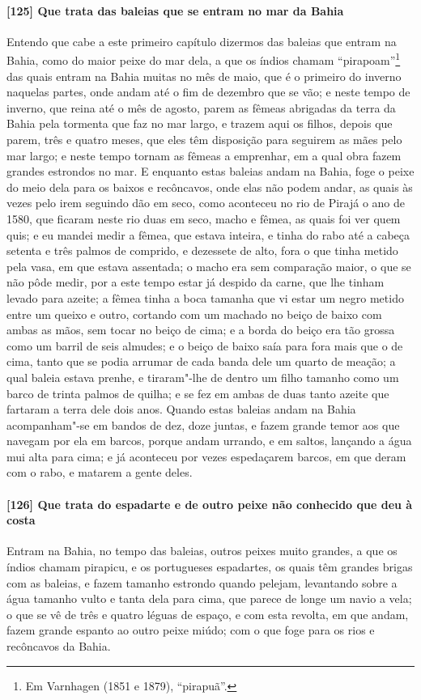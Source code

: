 \begin{linenumbers}
\paragraph{[125] Que trata das baleias que se entram no mar da Bahia}\quad
Entendo que cabe a este primeiro capítulo dizermos das baleias que entram na Bahia, como
do maior peixe do mar dela, a que os índios chamam ``pirapoam''\footnote{ Em Varnhagen
(1851 e 1879), ``pirapuã''.} das quais entram na Bahia muitas no mês de maio, que é o
primeiro do inverno naquelas partes, onde andam até o fim de dezembro que se vão; e neste
tempo de inverno, que reina até o mês de agosto, parem as fêmeas abrigadas da terra da
Bahia pela tormenta que faz no mar largo, e trazem aqui os filhos, depois que parem, três
e quatro meses, que eles têm disposição para seguirem as mães pelo mar largo; e neste
tempo tornam as fêmeas a emprenhar, em a qual obra fazem grandes estrondos no mar. E
enquanto estas baleias andam na Bahia, foge o peixe do meio dela para os baixos e
recôncavos, onde elas não podem andar, as quais às vezes pelo irem seguindo dão em seco,
como aconteceu no rio de Pirajá o ano de 1580, que ficaram neste rio duas em seco, macho e
fêmea, as quais foi ver quem quis; e eu mandei medir a fêmea, que estava inteira, e tinha
do rabo até a cabeça setenta e três palmos de comprido, e dezessete de alto, fora o que
tinha metido pela vasa, em que estava assentada; o macho era sem comparação maior, o que
se não pôde medir, por a este tempo estar já despido da carne, que lhe tinham levado para
azeite; a fêmea tinha a boca tamanha que vi estar um negro metido entre um queixo e outro,
cortando com um machado no beiço de baixo com ambas as mãos, sem tocar no beiço de cima; e
a borda do beiço era tão grossa como um barril de seis almudes; e o beiço de baixo saía
para fora mais que o de cima, tanto que se podia arrumar de cada banda dele um quarto de
meação; a qual baleia estava prenhe, e tiraram"-lhe de dentro um filho tamanho como um
barco de trinta palmos de quilha; e se fez em ambas de duas tanto azeite que fartaram a
terra dele dois anos. Quando estas baleias andam na Bahia acompanham"-se em bandos de dez,
doze juntas, e fazem grande temor aos que navegam por ela em barcos, porque andam urrando,
e em saltos, lançando a água mui alta para cima; e já aconteceu por vezes espedaçarem
barcos, em que deram com o rabo, e matarem a gente deles.

\paragraph{[126] Que trata do espadarte e de outro peixe não conhecido que deu à costa}\quad
Entram na Bahia, no tempo das baleias, outros peixes muito grandes, a que os índios chamam
pirapicu, e os portugueses espadartes, os quais têm grandes brigas com as baleias, e fazem
tamanho estrondo quando pelejam, levantando sobre a água tamanho vulto e tanta dela para
cima, que parece de longe um navio a vela; o que se vê de três e quatro léguas de espaço,
e com esta revolta, em que andam, fazem grande espanto ao outro peixe miúdo; com o que
foge para os rios e recôncavos da Bahia.


\end{linenumbers}
